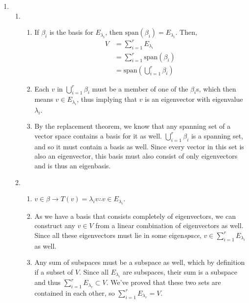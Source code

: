 \documentclass[12pt]{article}
\begin{document}
\begin{enumerate}
      \item \begin{enumerate}
                  \item \begin{enumerate}
                              \item If $\beta_i$ is the basis for $E_{\lambda_i}$, then $\text{span}(\beta_i)=E_{\lambda_i}$.
                                    Then, \begin{align*}
                                          V & = \sum_{i=1}^{r} E_{\lambda_i}                      \\
                                            & = \sum_{i=1}^{r} \text{span}(\beta_i)               \\
                                            & = \text{span}\left(\bigcup_{i=1}^{r} \beta_i\right)
                                    \end{align*}
                              \item Each $v$ in $\bigcup_{i=1}^{r} \beta_i$ must be a member of one of the $\beta_i$s, which then
                                    means $v \in E_{\lambda_i}$, thus implying that $v$ is an eigenvector with eigenvalue $\lambda_i$.
                              \item By the replacement theorem, we know that any spanning set of a vector space contains a basis for it as well.
                                    $\bigcup_{i=1}^{r} \beta_i$ is a spanning set, and so it must contain a basis as well.
                                    Since every vector in this set is also an eigenvector, this basis must also consist of only eigenvectors
                                    and is thus an eigenbasis.
                        \end{enumerate}
                  \item \begin{enumerate}
                              \item $v \in \beta \rightarrow T(v)=\lambda_i v \therefore v \in E_{\lambda_i}$.
                              \item As we have a basis that consists completely of eigenvectors,
                                    we can construct any $v \in V$ from a linear combination of eigenvectors as well.
                                    Since all these eigenvectors must lie in some eigen\textit{space},
                                    $v \in \sum_{i=1}^{r} E_{\lambda_i}$ as well.
                              \item Any sum of subspaces must be a subspace as well, which by definition if a subset of $V$.
                                    Since all $E_{\lambda_i}$ are subspaces, their sum is a subspace and thus $\sum_{i=1}^{r} E_{\lambda_r} \subset V$.
                                    We've proved that these two sets are contained in each other, so $\sum_{i=1}^{r} E_{\lambda_r} = V$.
                        \end{enumerate}
            \end{enumerate}


\end{enumerate}
\end{document}
